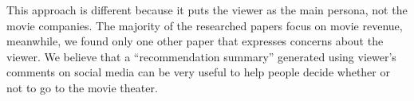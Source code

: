 
This approach is different because it puts the viewer as the main persona, not the movie companies. The majority of the researched papers focus on movie revenue, meanwhile, we found only one other paper that expresses concerns about the viewer. We believe that a ``recommendation summary'' generated using viewer's comments on social media can be very useful to help people decide whether or not to go to the movie theater.





%

